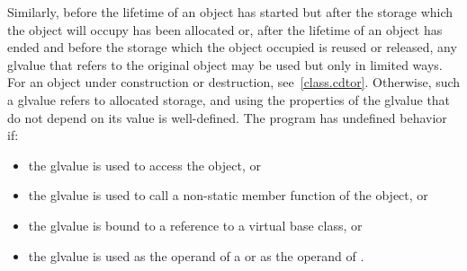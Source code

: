\pnum
Similarly, before the lifetime of an object has started but after the
storage which the object will occupy has been allocated or, after the
lifetime of an object has ended and before the storage which the object
occupied is reused or released, any glvalue that refers to the original
object may be used but only in limited ways.
For an object under construction or destruction, see~\ref{class.cdtor}.
Otherwise, such
a glvalue refers to
allocated storage, and using the
properties of the glvalue that do not depend on its value is
well-defined. The program has undefined behavior if:
\begin{itemize}
\item the glvalue is used to access the object, or
\item the glvalue is used to call a non-static member function of the object, or
\item the glvalue is bound to a reference to a virtual base class, or
\item the glvalue is used as the operand of a
 or as the operand of
.
\end{itemize}


